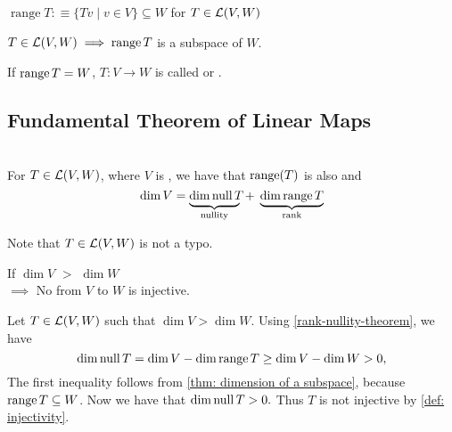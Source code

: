 \setcounter{thm}{15}
\begin{mydef} [range]
  $\operatorname{range}T :\equiv \{Tv \mid v \in V\} \subseteq W$ for $T \in {\mathcal{L}(V,W)}$
\end{mydef}

\setcounter{thm}{17}
\begin{thm} 
  \label{thm: the range is a subspace}
  $T\in \mathcal{L}(V,W) \implies \operatorname{range} T$ is a subspace of $W$.
\end{thm}

\setcounter{thm}{18}
\begin{mydef} [surjectivity]
  \label{def: surjectivity}
  If $\operatorname{range} T=W$, $T:V\to W$ is called  or .
\end{mydef}

\subsection{Fundamental Theorem of Linear Maps}

  \setcounter{thm}{20}
  \begin{thm} 
    \label{rank-nullity-theorem}
    \phantom{.} \\
    For $T \in \mathcal{L}(V,W)$, where $V$ is \fd, we have that $\operatorname{range}(T)$ is also \fd and
    \begin{equation}
      \dim V =
      \underbrace{ \dim\operatorname{null} T\phantom{g}\!\!\!\!\!}_{\text{nullity}}
      \; + \; \underbrace{\dim \operatorname{range} T}_{\text{rank}}
    \end{equation}

    Note that $T \in \mathcal{L}(V,W)$ is not a typo.
  \end{thm}

  \setcounter{thm}{21}
  \begin{thm} 
    \label{thm: linear-map-to-a-lower-dimensional-space-is-not-injective}
    If $\dim V$ $>$ $\dim W$ \\
    $\implies$ No \lm from $V$ to $W$ is injective.
  \end{thm}
  \begin{prf} Let $T\in \mathcal{L}(V,W)$ such that $\dim V > \dim W$. Using \ref{rank-nullity-theorem}, we have
    \begin{equation}
      \dim \operatorname{null} T = \dim V - \dim \operatorname{range} T \geq \dim V - \dim W > 0,
    \end{equation}
    The first inequality follows from \ref{thm: dimension of a subspace}, because $\operatorname{range} T \subseteq W$. Now we have that $\dim \operatorname{null} T > 0.$ Thus $T$ is not injective by \ref{def: injectivity}.
  \end{prf}

